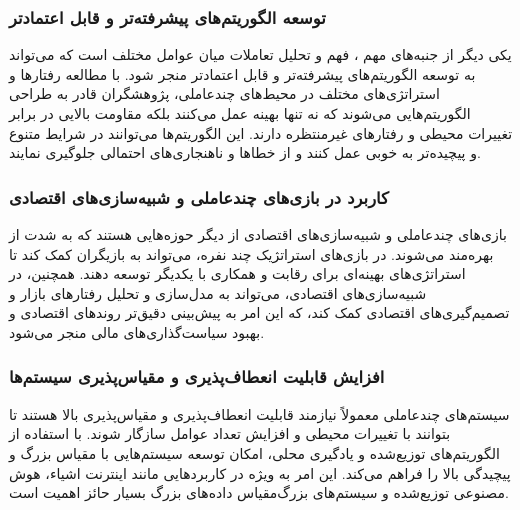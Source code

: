 \subsubsection{توسعه الگوریتم‌های پیشرفته‌تر و قابل اعتمادتر}
یکی دیگر از جنبه‌های مهم ، فهم و تحلیل تعاملات میان عوامل مختلف است که می‌تواند به توسعه الگوریتم‌های پیشرفته‌تر و قابل اعتمادتر منجر شود. با مطالعه رفتارها و استراتژی‌های مختلف در محیط‌های چندعاملی، پژوهشگران قادر به طراحی الگوریتم‌هایی می‌شوند که نه تنها بهینه عمل می‌کنند بلکه مقاومت بالایی در برابر تغییرات محیطی و رفتارهای غیرمنتظره دارند. این الگوریتم‌ها می‌توانند در شرایط متنوع و پیچیده‌تر به خوبی عمل کنند و از خطاها و ناهنجاری‌های احتمالی جلوگیری نمایند.

\subsubsection{کاربرد در بازی‌های چندعاملی و شبیه‌سازی‌های اقتصادی}
بازی‌های چندعاملی و شبیه‌سازی‌های اقتصادی از دیگر حوزه‌هایی هستند که به شدت از  بهره‌مند می‌شوند. در بازی‌های استراتژیک چند نفره،  می‌تواند به بازیگران کمک کند تا استراتژی‌های بهینه‌ای برای رقابت و همکاری با یکدیگر توسعه دهند. همچنین، در شبیه‌سازی‌های اقتصادی،  می‌تواند به مدل‌سازی و تحلیل رفتارهای بازار و تصمیم‌گیری‌های اقتصادی کمک کند، که این امر به پیش‌بینی دقیق‌تر روندهای اقتصادی و بهبود سیاست‌گذاری‌های مالی منجر می‌شود.

\subsubsection{افزایش قابلیت انعطاف‌پذیری و مقیاس‌پذیری سیستم‌ها}
سیستم‌های چندعاملی معمولاً نیازمند قابلیت انعطاف‌پذیری و مقیاس‌پذیری بالا هستند تا بتوانند با تغییرات محیطی و افزایش تعداد عوامل سازگار شوند.  با استفاده از الگوریتم‌های توزیع‌شده و یادگیری محلی، امکان توسعه سیستم‌هایی با مقیاس بزرگ و پیچیدگی بالا را فراهم می‌کند. این امر به ویژه در کاربردهایی مانند اینترنت اشیاء، هوش مصنوعی توزیع‌شده و سیستم‌های بزرگ‌مقیاس داده‌های بزرگ
 بسیار حائز اهمیت است.


